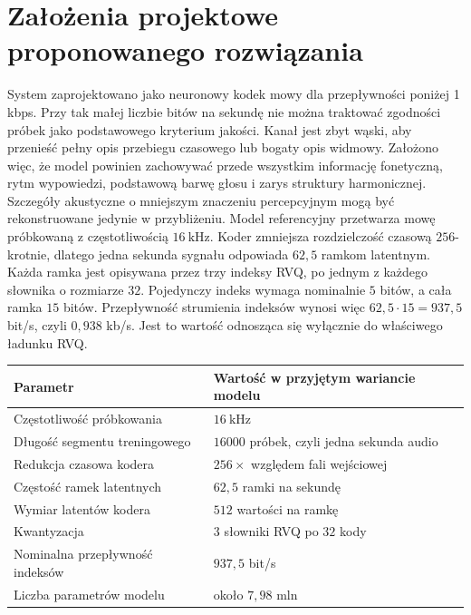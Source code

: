 \section{Założenia projektowe proponowanego rozwiązania}
\label{sec:zalozenia-projektowe}

System zaprojektowano jako neuronowy kodek mowy dla przepływności poniżej 1 kbps. Przy tak małej liczbie bitów na sekundę nie można traktować zgodności próbek jako podstawowego kryterium jakości. Kanał jest zbyt wąski, aby przenieść pełny opis przebiegu czasowego lub bogaty opis widmowy. Założono więc, że model powinien zachowywać przede wszystkim informację fonetyczną, rytm wypowiedzi, podstawową barwę głosu i zarys struktury harmonicznej. Szczegóły akustyczne o mniejszym znaczeniu percepcyjnym mogą być rekonstruowane jedynie w przybliżeniu. Model referencyjny przetwarza mowę próbkowaną z częstotliwością \(16\ \mathrm{kHz}\). Koder zmniejsza rozdzielczość czasową \(256\)-krotnie, dlatego jedna sekunda sygnału odpowiada \(62{,}5\) ramkom latentnym. Każda ramka jest opisywana przez trzy indeksy RVQ, po jednym z każdego słownika o rozmiarze \(32\). Pojedynczy indeks wymaga nominalnie \(5\) bitów, a cała ramka \(15\) bitów. Przepływność strumienia indeksów wynosi więc \(62{,}5 \cdot 15 = 937{,}5\) bit/s, czyli \(0{,}938\) kb/s. Jest to wartość odnosząca się wyłącznie do właściwego ładunku RVQ.

\begin{center}
\centering
\small
\begin{tabular}{>{\raggedright\arraybackslash}p{} >{\raggedright\arraybackslash}p{}}
\toprule
Parametr & Wartość w przyjętym wariancie modelu \\
\midrule
Częstotliwość próbkowania & \(16\ \mathrm{kHz}\) \\
Długość segmentu treningowego & \(16000\) próbek, czyli jedna sekunda audio \\
Redukcja czasowa kodera & \(256\times\) względem fali wejściowej \\
Częstość ramek latentnych & \(62{,}5\) ramki na sekundę \\
Wymiar latentów kodera & \(512\) wartości na ramkę \\
Kwantyzacja & \(3\) słowniki RVQ po \(32\) kody \\
Nominalna przepływność indeksów & \(937{,}5\) bit/s \\
Liczba parametrów modelu & około \(7{,}98\) mln \\
\bottomrule
\end{tabular}
\label{tab:parametry-konfiguracja-referencyjna}
\end{center}

